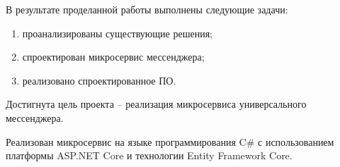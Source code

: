 \Conclusion %

\hfill

В результате проделанной работы выполнены следующие задачи:
\begin{enumerate}
		\item проанализированы существующие решения; 
		\item спроектирован микросервис мессенджера;
		\item реализовано спроектированное ПО. 
	\end{enumerate}
	
Достигнута цель проекта -- реализация микросервиса универсального мессенджера. 

Реализован микросервис на языке программирования C$\#$ с использованием платформы ASP.NET Core и технологии Entity Framework Core. 